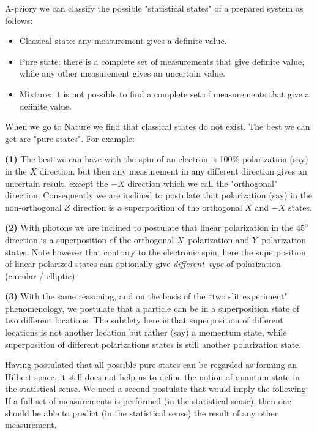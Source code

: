\documentclass[onecolumn,fleqn]{revtex4}
\begin{document}
A-priory we can classify the possible "statistical states" 
of a prepared system as follows: 
\begin{itemize}
\item Classical state: any measurement gives a definite value.
\item Pure state: there is a complete set of measurements that 
give definite value, while any other measurement gives an uncertain value.
\item Mixture: it is not possible to find a complete set of 
measurements that give a definite value. 
\end{itemize}
When we go to Nature we find that classical states do not exist. 
The best we can get are "pure states". For example:

{\bf (1)} The best we can have with the spin of an electron 
is 100\% polarization (say) in the $X$ direction, 
but then any measurement in any different direction 
gives an uncertain result, except the $-X$ direction which we 
call the "orthogonal" direction. Consequently we are inclined 
to postulate that polarization (say) in the non-orthogonal $Z$ direction 
is a superposition of the orthogonal $X$ and $-X$ states.

{\bf (2)} With photons we are inclined to postulate that 
linear polarization in the $45^o$ direction is a superposition 
of the orthogonal $X$~polarization and $Y$~polarization states.
Note however that contrary to the electronic spin, 
here the superposition of linear polarized states can optionally 
give {\em different~type} of polarization (circular / elliptic).   
  
{\bf (3)} With the same reasoning, and on the basis of the ``two slit experiment" 
phenomenology, we postulate that a particle can be in a superposition 
state of two different locations.  The subtlety here is that superposition 
of different locations is not another location but rather (say) a momentum state, 
while superposition of different polarizations states is still another 
polarization state. 

Having postulated that all possible pure states can be regarded  
as forming an Hilbert space, it still does not help us to define 
the notion of quantum state in the statistical sense.
We need a second postulate that would imply the following: 
If a full set of measurements is performed (in the statistical sense), 
then one should be able to predict (in the statistical sense) the result 
of any other measurement. 
\end{document}
